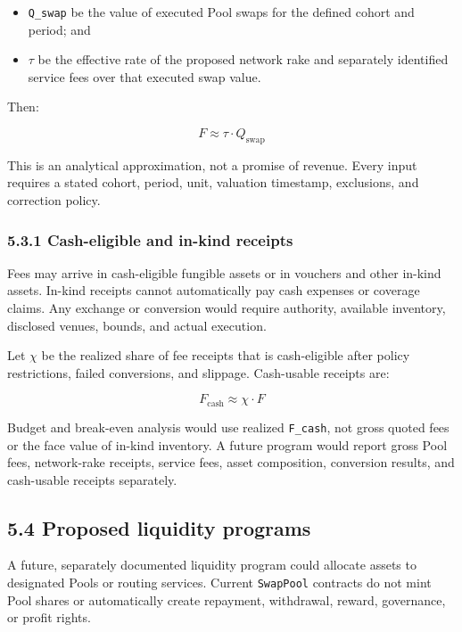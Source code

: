 \documentclass[11pt]{article}
\begin{document}
\begin{itemize}[leftmargin=*]
\item \texttt{Q\_swap} be the value of executed Pool swaps for the defined cohort and period; and
\item \texttt{$\tau$} be the effective rate of the proposed network rake and separately identified service fees over that executed swap value.
\end{itemize}
Then:

\[
F \approx \tau \cdot Q_{\mathrm{swap}}
\]

This is an analytical approximation, not a promise of revenue. Every input requires a stated cohort, period, unit, valuation timestamp, exclusions, and correction policy.

\subsubsection*{5.3.1 Cash-eligible and in-kind receipts}

Fees may arrive in cash-eligible fungible assets or in vouchers and other in-kind assets. In-kind receipts cannot automatically pay cash expenses or coverage claims. Any exchange or conversion would require authority, available inventory, disclosed venues, bounds, and actual execution.

Let \texttt{$\chi$} be the realized share of fee receipts that is cash-eligible after policy restrictions, failed conversions, and slippage. Cash-usable receipts are:

\[
F_{\mathrm{cash}} \approx \chi \cdot F
\]

Budget and break-even analysis would use realized \texttt{F\_cash}, not gross quoted fees or the face value of in-kind inventory. A future program would report gross Pool fees, network-rake receipts, service fees, asset composition, conversion results, and cash-usable receipts separately.

\subsection*{5.4 Proposed liquidity programs}

A future, separately documented liquidity program could allocate assets to designated Pools or routing services. Current \texttt{SwapPool} contracts do not mint Pool shares or automatically create repayment, withdrawal, reward, governance, or profit rights.
\end{document}
